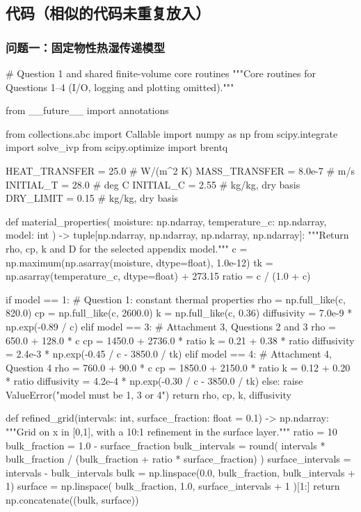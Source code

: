 \documentclass[withoutpreface,bwprint]{cumcmthesis}
\begin{document}
\clearpage
\subsection*{\centering 代码（相似的代码未重复放入）}

\subsubsection*{\centering 问题一：固定物性热湿传递模型}
\begin{PythonCode}
# Question 1 and shared finite-volume core routines
"""Core routines for Questions 1--4 (I/O, logging and plotting omitted)."""

from __future__ import annotations

from collections.abc import Callable
import numpy as np
from scipy.integrate import solve_ivp
from scipy.optimize import brentq


HEAT_TRANSFER = 25.0       # W/(m^2 K)
MASS_TRANSFER = 8.0e-7     # m/s
INITIAL_T = 28.0           # deg C
INITIAL_C = 2.55           # kg/kg, dry basis
DRY_LIMIT = 0.15           # kg/kg, dry basis


def material_properties(
    moisture: np.ndarray, temperature_c: np.ndarray, model: int
) -> tuple[np.ndarray, np.ndarray, np.ndarray, np.ndarray]:
    """Return rho, cp, k and D for the selected appendix model."""
    c = np.maximum(np.asarray(moisture, dtype=float), 1.0e-12)
    tk = np.asarray(temperature_c, dtype=float) + 273.15
    ratio = c / (1.0 + c)

    if model == 1:  # Question 1: constant thermal properties
        rho = np.full_like(c, 820.0)
        cp = np.full_like(c, 2600.0)
        k = np.full_like(c, 0.36)
        diffusivity = 7.0e-9 * np.exp(-0.89 / c)
    elif model == 3:  # Attachment 3, Questions 2 and 3
        rho = 650.0 + 128.0 * c
        cp = 1450.0 + 2736.0 * ratio
        k = 0.21 + 0.38 * ratio
        diffusivity = 2.4e-3 * np.exp(-0.45 / c - 3850.0 / tk)
    elif model == 4:  # Attachment 4, Question 4
        rho = 760.0 + 90.0 * c
        cp = 1850.0 + 2150.0 * ratio
        k = 0.12 + 0.20 * ratio
        diffusivity = 4.2e-4 * np.exp(-0.30 / c - 3850.0 / tk)
    else:
        raise ValueError("model must be 1, 3 or 4")
    return rho, cp, k, diffusivity


def refined_grid(intervals: int, surface_fraction: float = 0.1) -> np.ndarray:
    """Grid on x in [0,1], with a 10:1 refinement in the surface layer."""
    ratio = 10
    bulk_fraction = 1.0 - surface_fraction
    bulk_intervals = round(
        intervals * bulk_fraction / (bulk_fraction + ratio * surface_fraction)
    )
    surface_intervals = intervals - bulk_intervals
    bulk = np.linspace(0.0, bulk_fraction, bulk_intervals + 1)
    surface = np.linspace(
        bulk_fraction, 1.0, surface_intervals + 1
    )[1:]
    return np.concatenate((bulk, surface))



\end{PythonCode}
\end{document}
